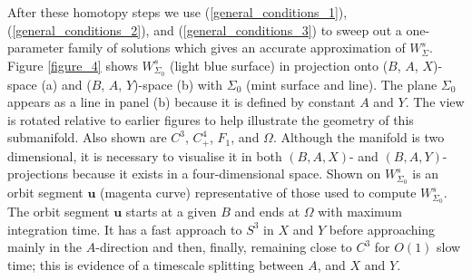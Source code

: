 \documentclass{ws-ijbc}
\begin{document}
After these homotopy steps we use (\ref{general_conditions_1}), (\ref{general_conditions_2}), and (\ref{general_conditions_3}) to sweep out a one-parameter family of solutions which gives an accurate approximation of $W^s_\Sigma$.  Figure \ref{figure_4} shows $W^s_{\Sigma_0}$ (light blue surface) in projection onto ($B$, $A$, $X$)-space (a) and ($B$, $A$, $Y$)-space (b) with $\Sigma_0$ (mint surface and line).  The plane $\Sigma_0$ appears as a line in panel (b) because it is defined by constant $A$ and $Y$.  The view is rotated relative to earlier figures to help illustrate the geometry of this submanifold.  Also shown are $C^3$, $C^4_+$, $F_1$, and $\Omega$.  Although the manifold is two dimensional, it is necessary to visualise it in both $(B,A,X)$- and $(B,A,Y)$-projections because it exists in a four-dimensional space.  Shown on $W^s_{\Sigma_0}$ is an orbit segment $\mathbf{u}$ (magenta curve) representative of those used to compute $W^s_{\Sigma_0}$.  The orbit segment $\mathbf{u}$ starts at a given $B$ and ends at $\Omega$ with maximum integration time.  It has a fast approach to $S^3$ in $X$ and $Y$ before approaching mainly in the $A$-direction and then, finally, remaining close to $C^3$ for $O(1)$ slow time; this is evidence of a timescale splitting  between $A$, and $X$ and $Y$.
\end{document}
